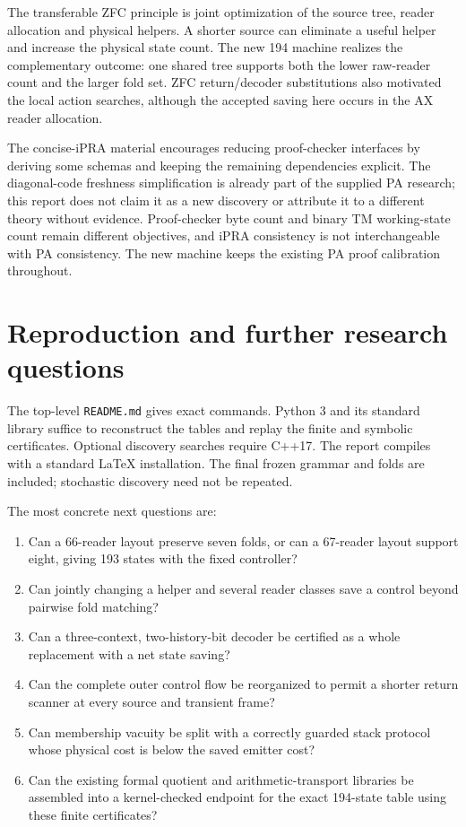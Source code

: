 \documentclass[11pt,letterpaper]{article}
\newcommand{\file}[1]{\texttt{\nolinkurl{#1}}}
\begin{document}
The transferable ZFC principle is joint optimization of the source tree,
reader allocation and physical helpers. A shorter source can eliminate a
useful helper and increase the physical state count. The new 194 machine
realizes the complementary outcome: one shared tree supports both the lower
raw-reader count and the larger fold set. ZFC return/decoder substitutions
also motivated the local action searches, although the accepted saving
here occurs in the AX reader allocation.

The concise-iPRA material encourages reducing proof-checker interfaces by
deriving some schemas and keeping the remaining dependencies explicit.
The diagonal-code freshness simplification is already part of the supplied
PA research; this report does not claim it as a new discovery or attribute
it to a different theory without evidence. Proof-checker byte count and
binary TM working-state count remain different objectives, and iPRA
consistency is not interchangeable with PA consistency. The new machine
keeps the existing PA proof calibration throughout.

\section{Reproduction and further research questions}

The top-level \file{README.md} gives exact commands. Python 3 and its
standard library suffice to reconstruct the tables and replay the finite
and symbolic certificates. Optional discovery searches require C++17.
The report compiles with a standard LaTeX installation. The final frozen
grammar and folds are included; stochastic discovery need not be repeated.

The most concrete next questions are:
\begin{enumerate}
\item Can a 66-reader layout preserve seven folds, or can a 67-reader
      layout support eight, giving 193 states with the fixed controller?
\item Can jointly changing a helper and several reader classes save a
      control beyond pairwise fold matching?
\item Can a three-context, two-history-bit decoder be certified as a
      whole replacement with a net state saving?
\item Can the complete outer control flow be reorganized to permit a
      shorter return scanner at every source and transient frame?
\item Can membership vacuity be split with a correctly guarded stack
      protocol whose physical cost is below the saved emitter cost?
\item Can the existing formal quotient and arithmetic-transport libraries
      be assembled into a kernel-checked endpoint for the exact 194-state
      table using these finite certificates?
\end{enumerate}
\end{document}
